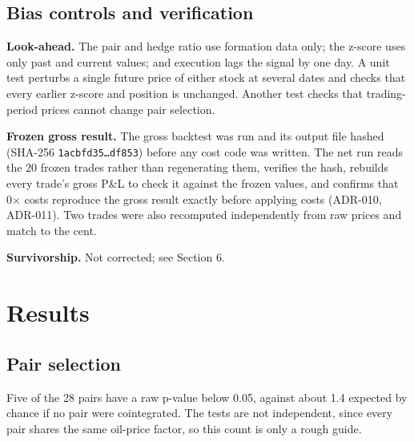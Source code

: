 \documentclass[11pt]{article}
\begin{document}
\hypertarget{bias-controls-and-verification}{%
\subsection{Bias controls and verification}\label{bias-controls-and-verification}}

\textbf{Look-ahead.} The pair and hedge ratio use formation data only; the
z-score uses only past and current values; and execution lags the signal
by one day. A unit test perturbs a single future price of either stock at
several dates and checks that every earlier z-score and position is
unchanged. Another test checks that trading-period prices cannot change
pair selection.

\textbf{Frozen gross result.} The gross backtest was run and its output file
hashed (SHA-256 \texttt{1acbfd35…df853}) before any cost code was written. The net
run reads the 20 frozen trades rather than regenerating them, verifies the
hash, rebuilds every trade's gross P\&L to check it against the frozen
values, and confirms that 0× costs reproduce the gross result exactly
before applying costs (ADR-010, ADR-011). Two trades were also recomputed
independently from raw prices and match to the cent.

\textbf{Survivorship.} Not corrected; see Section 6.

\hypertarget{results}{%
\section{Results}\label{results}}

\hypertarget{pair-selection}{%
\subsection{Pair selection}\label{pair-selection}}

Five of the 28 pairs have a raw p-value below 0.05, against about 1.4
expected by chance if no pair were cointegrated. The tests are not
independent, since every pair shares the same oil-price factor, so this
count is only a rough guide.
\end{document}
